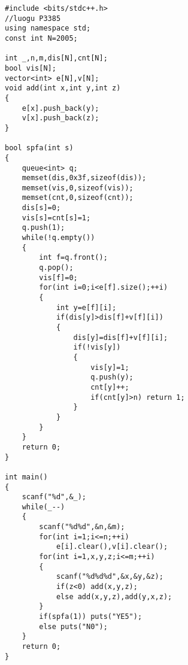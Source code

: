 \begin{lstlisting}
#include <bits/stdc++.h>
//luogu P3385
using namespace std;
const int N=2005;

int _,n,m,dis[N],cnt[N];
bool vis[N];
vector<int> e[N],v[N];
void add(int x,int y,int z)
{
	e[x].push_back(y);
	v[x].push_back(z);
}

bool spfa(int s)
{
	queue<int> q;
	memset(dis,0x3f,sizeof(dis));
	memset(vis,0,sizeof(vis));
	memset(cnt,0,sizeof(cnt));
	dis[s]=0;
	vis[s]=cnt[s]=1;
	q.push(1);
	while(!q.empty())
	{
		int f=q.front();
		q.pop();
		vis[f]=0;
		for(int i=0;i<e[f].size();++i)
		{
			int y=e[f][i];
			if(dis[y]>dis[f]+v[f][i])
			{
				dis[y]=dis[f]+v[f][i];
				if(!vis[y])
				{
					vis[y]=1;
					q.push(y);
					cnt[y]++;
					if(cnt[y]>n) return 1;
				}
			}
		}
	}
	return 0;
}

int main()
{
	scanf("%d",&_);
	while(_--)
	{
		scanf("%d%d",&n,&m);
		for(int i=1;i<=n;++i)
			e[i].clear(),v[i].clear();
		for(int i=1,x,y,z;i<=m;++i)
		{
			scanf("%d%d%d",&x,&y,&z);
			if(z<0) add(x,y,z);
			else add(x,y,z),add(y,x,z);
		}
		if(spfa(1)) puts("YE5");
		else puts("N0");
	}
	return 0;
}
\end{lstlisting}
